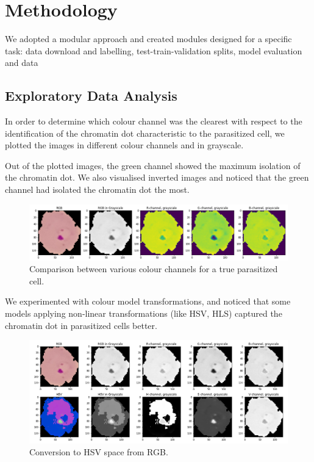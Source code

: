 \documentclass[10pt,twocolumn,letterpaper]{article}
\begin{document}
\section{Methodology}

We adopted a modular approach and created modules designed for a specific task: data download and labelling, test-train-validation splits, model evaluation and data

\subsection{Exploratory Data Analysis}
In order to determine which colour channel was the clearest with respect to the identification of the chromatin dot characteristic to the parasitized cell, we plotted the images in different colour channels and in grayscale.

Out of the plotted images, the green channel showed the maximum isolation of the chromatin dot. We also visualised inverted images and noticed that the green channel had isolated the chromatin dot the most.
\begin{figure}[t]
   \begin{center}
      \includegraphics[width=1\linewidth]{../Plots/Comparison between channels.png}
   \end{center}
      \caption{Comparison between various colour channels for a true parasitized cell.}
   \label{fig:channel_comparison}
\end{figure}

We experimented with colour model transformations, and noticed that some models applying non-linear transformations (like HSV, HLS) captured the chromatin dot in parasitized cells better.

\begin{figure}[t]
   \begin{center}
      \includegraphics[width=1\linewidth]{../Plots/hsv_conversion.png}
   \end{center}
      \caption{Conversion to HSV space from RGB.}
   \label{fig:HSV_space}
\end{figure}
\end{document}
